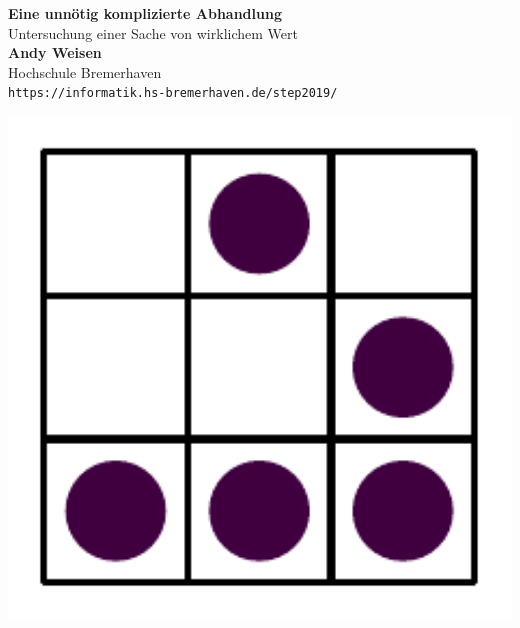\documentclass[paper=a1,pagesize,parskip=half-,fontsize=24.88pt]{scrartcl}
\begin{document}
\begin{minipage}[b]{0.74\linewidth}
  \huge\textbf{Eine unnötig komplizierte Abhandlung}\\[1cm]
  \huge{Untersuchung einer Sache von wirklichem Wert}\\[2cm] 
  \huge\textbf{Andy Weisen}\\[0.5cm]
  \Large Hochschule Bremerhaven\\[0.4cm]
  \Large\texttt{https://informatik.hs-bremerhaven.de/step2019/}\\
\end{minipage}
%
\begin{minipage}[t]{0.25\linewidth}
\includegraphics[width=14cm]{glider}\\
\end{minipage}
\end{document}
